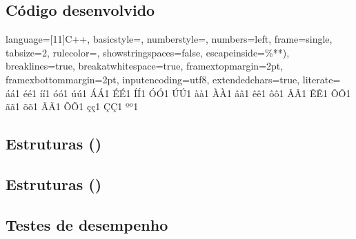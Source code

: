 \begin{apendicesenv}

\chapter{Código desenvolvido}

\lstset
{
	language=[11]C++,
	basicstyle=\ttfamily\scriptsize,
	numberstyle=\scriptsize,
	numbers=left,
	frame=single,
	tabsize=2,
	rulecolor=\color{black!30},
	showstringspaces=false,
	escapeinside={\%*}{*)},
	breaklines=true,
	breakatwhitespace=true,
	framextopmargin=2pt,
	framexbottommargin=2pt,
	inputencoding=utf8,
	extendedchars=true,
	literate=
	{á}{{\'a}}1 {é}{{\'e}}1 {í}{{\'i}}1 {ó}{{\'o}}1 {ú}{{\'u}}1
	{Á}{{\'A}}1 {É}{{\'E}}1 {Í}{{\'I}}1 {Ó}{{\'O}}1 {Ú}{{\'U}}1
	{à}{{\`a}}1
	{À}{{\`A}}1
	{â}{{\^a}}1 {ê}{{\^e}}1 {ô}{{\^o}}1
	{Â}{{\^A}}1 {Ê}{{\^E}}1 {Ô}{{\^O}}1
	{ã}{{\~{a}}}1 {õ}{{\~{o}}}1
	{Ã}{{\~{A}}}1 {Õ}{{\~{O}}}1
	{ç}{{\c c}}1 {Ç}{{\c C}}1
	{º}{{$^o$}}1
}
\newcommand \codigo[2] {}
\newcommand \codarv[2] {\codigo{arv/#1}{arv/#2}}
\newcommand \codmat[2] {\codigo{matriz/#1}{matriz/#2}}
\newcommand \codtst[2] {\codigo{tst_tmp/#1}{tst\_tmp/#2}}

\section{Estruturas (\Novo)}

\codarv{arv.h}        {arv.h}
\codarv{arv_mod.h}    {arv\_mod.h}
\codarv{config_dbg.h} {config\_dbg.h}
\codarv{constr.h}     {constr.h}
\codarv{id.h}         {id.h}
\codarv{percorr.h}    {percorr.h}
\codarv{tst_estr.cpp} {tst\_estr.cpp}


\section{Estruturas (\Matriz)}

\codmat{arv.h}        {arv.h}
\codmat{config_dbg.h} {config\_dbg.h}
\codmat{constr.h}     {constr.h}
\codmat{percorr.h}    {percorr.h}
\codmat{tst_estr.cpp} {tst\_estr.cpp}


\section{Testes de desempenho}

\codtst{tst_tmp.cpp}      {tst\_tmp.cpp}
\codtst{tst_tmp.h}        {tst\_tmp.h}
\codtst{tst_tmp_arv.h}    {tst\_tmp\_arv.h}
\codtst{tst_tmp_hwloc.h}  {tst\_tmp\_hwloc.h}
\codtst{tst_tmp_matriz.h} {tst\_tmp\_matriz.h}

\end{apendicesenv}